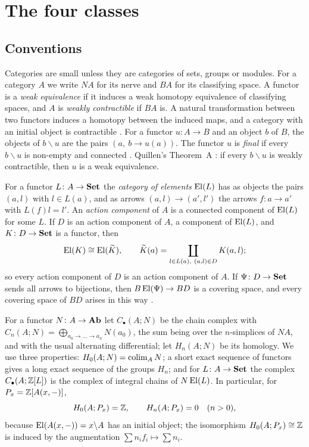 \section{The four classes}\label{sec:classes}

\subsection{Conventions}

Categories are small unless they are categories of sets, groups or modules.
For a category $A$ we write $NA$ for its nerve and $BA$ for its classifying
space. A functor is a \emph{weak equivalence} if it induces a weak homotopy
equivalence of classifying spaces, and $A$ is \emph{weakly contractible} if
$BA$ is. A natural transformation between two functors induces a homotopy
between the induced maps, and a category with an initial object is
contractible \cite[\S 1, Proposition~2 and Corollary~2]{Quillen}. For a
functor $u\colon A\to B$ and an object $b$ of $B$, the objects of
$b\backslash u$ are the pairs $(a,\ b\to u(a))$. The functor $u$ is
\emph{final} if every $b\backslash u$ is non-empty and connected
\cite[IX.3]{CWM}. Quillen's Theorem~A \cite[\S 1]{Quillen}: if every
$b\backslash u$ is weakly contractible, then $u$ is a weak equivalence.

For a functor $L\colon A\to\mathbf{Set}$ the \emph{category of elements} $\operatorname{El}(L)$ has
as objects the pairs $(a,l)$ with $l\in L(a)$, and as arrows
$(a,l)\to(a',l')$ the arrows $f\colon a\to a'$ with $L(f)l=l'$. An
\emph{action component} of $A$ is a connected component of $\operatorname{El}(L)$ for some
$L$. If $D$ is an action component of $A$, a component of $\operatorname{El}(L)$, and
$K\colon D\to\mathbf{Set}$ is a functor, then
\begin{equation}\label{eq:composite}
 \operatorname{El}(K)\cong\operatorname{El}(\widetilde K),\qquad
 \widetilde K(a)=\coprod_{l\in L(a),\ (a,l)\in D}K(a,l) ;
\end{equation}
so every action component of $D$ is an action component of $A$. If
$\Psi\colon D\to\mathbf{Set}$ sends all arrows to bijections, then
$B\operatorname{El}(\Psi)\to BD$ is a covering space, and every covering space of $BD$
arises in this way \cite[\S 1, Proposition~1]{Quillen}.

For a functor $N\colon A\to\mathbf{Ab}$ let $C_\bullet(A;N)$ be the chain complex with
$C_n(A;N)=\bigoplus_{a_0\to\dots\to a_n}N(a_0)$, the sum being over the
$n$-simplices of $NA$, and with the usual alternating differential; let
$H_n(A;N)$ be its homology. We use three properties: $H_0(A;N)=\operatorname{colim}_AN$; a
short exact sequence of functors gives a long exact sequence of the groups
$H_n$; and for $L\colon A\to\mathbf{Set}$ the complex $C_\bullet(A;\mathbb{Z}[L])$ is the
complex of integral chains of $N\operatorname{El}(L)$. In particular, for
$P_x=\mathbb{Z}[A(x,-)]$,
\begin{equation}\label{eq:rep}
 H_0(A;P_x)=\mathbb{Z},\qquad H_n(A;P_x)=0\quad(n>0),
\end{equation}
because $\operatorname{El}(A(x,-))=x\backslash A$ has an initial object; the isomorphism
$H_0(A;P_x)\cong\mathbb{Z}$ is induced by the augmentation
$\sum n_if_i\mapsto\sum n_i$.

